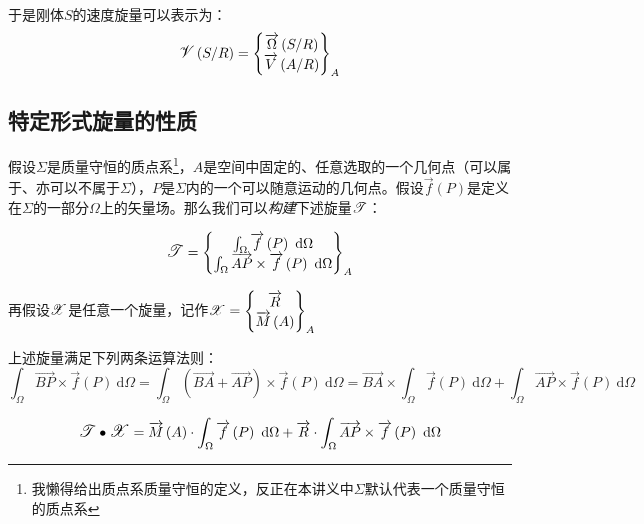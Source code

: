 \documentclass[UTF8]{ctexart}%
\begin{document}
于是刚体$S$的速度旋量可以表示为：
\begin{equation}
\mathlarger{\mathscr{V}}\left(S/R\right)=\left\{\begin{matrix}
  \overrightarrow{\Omega}\left(S/R\right) \\
  \overrightarrow{V}\left(A/R\right) 
 \end{matrix} \right\}_A
\end{equation}

\subsection{特定形式旋量的性质}
\label{sec:特定形式旋量的性质}
假设$\Sigma$是质量守恒的质点系\footnote{我懒得给出质点系质量守恒的定义，反正在本讲义中$\Sigma$默认代表一个质量守恒的质点系}，$A$是空间中固定的、任意选取的一个几何点（可以属于、亦可以不属于$\Sigma$），$P$是$\Sigma$内的一个可以随意运动的几何点。假设$\overrightarrow{f}\left(P\right)$是定义在$\Sigma$的一部分$\Omega$上的矢量场。那么我们可以\emph{构建}下述旋量$\mathlarger{\mathscr{T}}$：

\begin{equation}
\mathlarger{\mathscr{T}}=\left\{\begin{matrix}
  \int_{\Omega}\overrightarrow{f}\left(P\right)\ \mathrm{d}\Omega \\
  \int_{\Omega}\overrightarrow{AP}\times\overrightarrow{f}\left(P\right)\ \mathrm{d}\Omega 
 \end{matrix} \right\}_A
\end{equation}

再假设$\mathlarger{\mathscr{X}}$是任意一个旋量，记作$\mathlarger{\mathscr{X}}=\left\{\begin{matrix}
  \overrightarrow{R} \\
  \overrightarrow{M}\left(A\right) 
 \end{matrix} \right\}_A$

上述旋量满足下列两条运算法则：
\begin{equation}
\int_{\Omega}\overrightarrow{BP}\times\overrightarrow{f}\left(P\right)\ \mathrm{d}\Omega=\int_{\Omega}\left(\overrightarrow{BA}+\overrightarrow{AP}\right)\times\overrightarrow{f}\left(P\right)\ \mathrm{d}\Omega=\overrightarrow{BA}\times\int_{\Omega}\overrightarrow{f}\left(P\right)\ \mathrm{d}\Omega+\int_{\Omega}\overrightarrow{AP}\times\overrightarrow{f}\left(P\right)\ \mathrm{d}\Omega
\end{equation}

\begin{equation}
\mathlarger{\mathscr{T}}\bullet \mathlarger{\mathscr{X}}=\overrightarrow{M}\left(A\right)\cdot\int_{\Omega}\overrightarrow{f}\left(P\right)\ \mathrm{d}\Omega+\overrightarrow{R}\cdot\int_{\Omega}\overrightarrow{AP}\times\overrightarrow{f}\left(P\right)\ \mathrm{d}\Omega
\end{equation}
\end{document}
